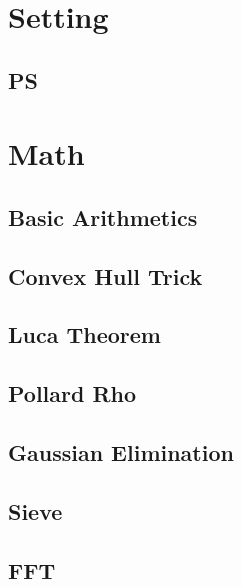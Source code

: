 \documentclass[10pt,landscape,a4paper,twocolumn]{article}
\begin{document}
\tableofcontents


\section{Setting}
\subsection{PS}





\section{Math}
\subsection{Basic Arithmetics}


\subsection{Convex Hull Trick}


\subsection{Luca Theorem}


\subsection{Pollard Rho}


\subsection{Gaussian Elimination}


\subsection{Sieve}




\subsection{FFT}

\end{document}
